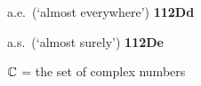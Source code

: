 \indexmedskip 
















a.e.\ (`almost everywhere') {\bf 112Dd}

a.s.\ (`almost surely') {\bf 112De}



























\indexmedskip
{}











$\Bbb C$ = the set of complex numbers























































